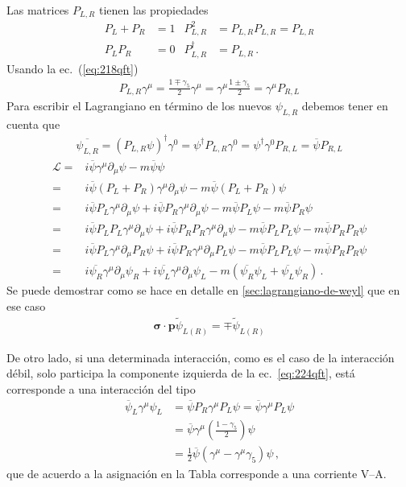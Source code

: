 Las matrices $P_{L,R}$ tienen las propiedades
\begin{align}
  P_L+P_R&=1 & P_{L,R}^2&=P_{L,R}P_{L,R}=P_{L,R}\nonumber\\
  P_L P_R&=0& P_{L,R}^\dagger&=P_{L,R}\,.
\end{align}
Usando la ec.~(\ref{eq:218qft})
\begin{align}
  P_{L,R}\gamma^\mu=\frac{1\mp\gamma_5}{2}\gamma^\mu=\gamma^\mu\frac{1\pm\gamma_5}{2}=\gamma^\mu P_{R,L}
\end{align}
Para escribir el Lagrangiano en término de los nuevos $\psi_{L,R}$ debemos tener en cuenta que
\begin{align}
  \overline{\psi_{L,R}}=(P_{L,R}\psi)^\dagger\gamma^0=\psi^\dagger P_{L,R}\gamma^0=\psi^\dagger\gamma^0P_{R,L}=\overline{\psi}P_{R,L}
\end{align}
\begin{align}
  \label{eq:221qft}
  \mathcal{L}=&i\overline{\psi}\gamma^\mu\partial_\mu\psi-m\overline{\psi}\psi\nonumber\\
  =&i\overline{\psi}(P_L+P_R)\gamma^\mu\partial_\mu\psi-m\overline{\psi}(P_L+P_R)\psi\nonumber\\
  =&i\overline{\psi}P_L\gamma^\mu\partial_\mu\psi+i\overline{\psi}P_R\gamma^\mu\partial_\mu\psi-m\overline{\psi}P_L\psi-m\overline{\psi}P_R\psi\nonumber\\
  =&i\overline{\psi}P_L P_L\gamma^\mu\partial_\mu\psi+i\overline{\psi}P_R P_R\gamma^\mu\partial_\mu\psi-m\overline{\psi}P_L P_L\psi-m\overline{\psi}P_R P_R\psi\nonumber\\
  =&i\overline{\psi}P_L\gamma^\mu\partial_\mu P_R\psi+i\overline{\psi}P_R\gamma^\mu\partial_\mu P_L\psi-m\overline{\psi}P_L P_L\psi-m\overline{\psi}P_R P_R\psi\nonumber\\
  =&i\overline{\psi_R}\gamma^\mu\partial_\mu\psi_R+i\overline{\psi_L}\gamma^\mu\partial_\mu\psi_L-m(\overline{\psi_R}\psi_L+\overline{\psi_L}\psi_R)\,.
\end{align}
Se puede demostrar como se hace en detalle en \ref{sec:lagrangiano-de-weyl} que en ese caso
\begin{align*}
   \boldsymbol{\sigma}\cdot \mathbf{p}\widetilde{\psi}_{L(R)}=\mp \widetilde{\psi}_{L(R)}
\end{align*}


De otro lado, si una determinada interacción, como es el caso de la interacción débil, solo participa la componente izquierda de la ec.~\eqref{eq:224qft}, está corresponde a una interacción del tipo
\begin{align}
  \overline{\psi}_L\gamma^\mu\psi_L&=\overline{\psi}P_R\gamma^\mu P_L\psi=\overline{\psi}\gamma^\mu P_L\psi\nonumber\\
  &=\overline{\psi}\gamma^\mu\left(\frac{1-\gamma_5}{2}\right)\psi\nonumber\\
  &=\tfrac{1}{2}\overline{\psi}\left(\gamma^\mu-\gamma^\mu\gamma_5\right)\psi\,,
\end{align}
que de acuerdo a la asignación en la Tabla corresponde a una corriente V--A.


